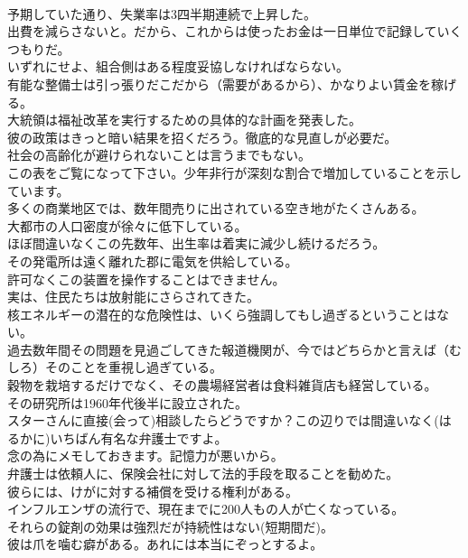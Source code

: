 \documentclass[8pt]{extreport}
\begin{document}
\begin{CJK}{UTF8}{min}
\\	予期していた通り、失業率は3四半期連続で上昇した。
\\	出費を減らさないと。だから、これからは使ったお金は一日単位で記録していくつもりだ。
\\	いずれにせよ、組合側はある程度妥協しなければならない。
\\	有能な整備士は引っ張りだこだから（需要があるから）、かなりよい賃金を稼げる。
\\	大統領は福祉改革を実行するための具体的な計画を発表した。
\\	彼の政策はきっと暗い結果を招くだろう。徹底的な見直しが必要だ。
\\	社会の高齢化が避けられないことは言うまでもない。
\\	この表をご覧になって下さい。少年非行が深刻な割合で増加していることを示しています。
\\	多くの商業地区では、数年間売りに出されている空き地がたくさんある。
\\	大都市の人口密度が徐々に低下している。
\\	ほぼ間違いなくこの先数年、出生率は着実に減少し続けるだろう。
\\	その発電所は遠く離れた郡に電気を供給している。
\\	許可なくこの装置を操作することはできません。
\\	実は、住民たちは放射能にさらされてきた。
\\	核エネルギーの潜在的な危険性は、いくら強調してもし過ぎるということはない。
\\	過去数年間その問題を見過ごしてきた報道機関が、今ではどちらかと言えば（むしろ）そのことを重視し過ぎている。
\\	穀物を栽培するだけでなく、その農場経営者は食料雑貨店も経営している。
\\	その研究所は1960年代後半に設立された。
\\	スターさんに直接(会って)相談したらどうですか？この辺りでは間違いなく(はるかに)いちばん有名な弁護士ですよ。
\\	念の為にメモしておきます。記憶力が悪いから。
\\	弁護士は依頼人に、保険会社に対して法的手段を取ることを勧めた。
\\	彼らには、けがに対する補償を受ける権利がある。
\\	インフルエンザの流行で、現在までに200人もの人が亡くなっている。
\\	それらの錠剤の効果は強烈だが持続性はない(短期間だ)。
\\	彼は爪を噛む癖がある。あれには本当にぞっとするよ。

\end{CJK}
\end{document}
